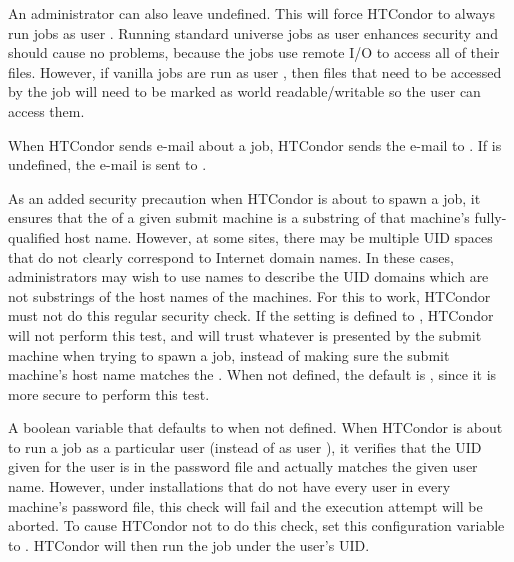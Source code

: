 \begin{description}
  An administrator can also leave  undefined.
  This will force HTCondor to always run jobs as user .
  Running standard universe jobs as user  enhances
  security and should cause no problems, because the jobs use remote
  I/O to access all of their files.
  However, if vanilla jobs are run as
  user , then files that need to be accessed by the job will need
  to be marked as world readable/writable so the user  can access
  them.

  When HTCondor sends e-mail about a job, HTCondor sends the e-mail to
  .
  If 
  is undefined, the e-mail is sent to .


\label{param:TrustUidDomain}
\item[\Macro{TRUST\_UID\_DOMAIN}]
  As an added security precaution when HTCondor is about to spawn a job,
  it ensures that the  of a given
  submit machine is a substring of that machine's fully-qualified
  host name.
  However, at some sites, there may be multiple UID spaces that do
  not clearly correspond to Internet domain names.
  In these cases, administrators may wish to use names to describe the
  UID domains which are not substrings of the host names of the
  machines.
  For this to work, HTCondor must not do this regular security check.
  If the  setting is defined to ,
  HTCondor will not perform this test, and will trust whatever
   is presented by the submit machine when trying
  to spawn a job, instead of making sure the submit machine's host name
  matches the .
  When not defined, the default is ,
  since it is more secure to perform this test. 

\label{param:SoftUidDomain}
\item[\Macro{SOFT\_UID\_DOMAIN}]
  A boolean variable that defaults to  when not defined.
  When HTCondor is about to run a job as a particular user 
  (instead of as user ),
  it verifies that the UID given for the user is in the
  password file and actually matches the given user name.
  However, under installations that do not have every user
  in every machine's password file,
  this check will fail and the execution attempt will be aborted.
  To cause HTCondor not to do
  this check, set this configuration variable to .
  HTCondor will then run the job under the user's UID.


\end{description}

